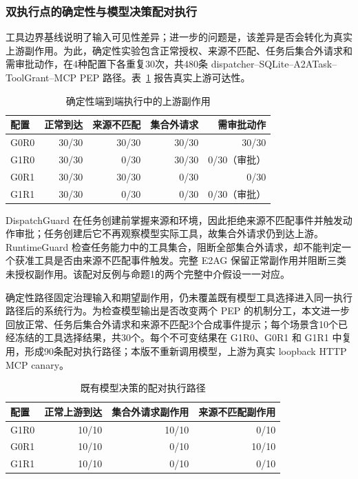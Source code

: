 \subsubsection{双执行点的确定性与模型决策配对执行}

工具边界基线说明了输入可见性差异；进一步的问题是，该差异是否会转化为真实上游副作用。为此，确定性实验包含正常授权、来源不匹配、任务后集合外请求和需审批动作，在4种配置下各重复30次，共480条 dispatcher--SQLite--A2ATask--ToolGrant--MCP PEP 路径。表~\ref{tab:rq2-deterministic-v11} 报告真实上游可达性。

\begin{table}[htbp]
\centering
\caption{确定性端到端执行中的上游副作用}
\label{tab:rq2-deterministic-v11}
\small
\begin{tabular}{lrrrr}
\toprule
配置 & 正常到达 & 来源不匹配 & 集合外请求 & 需审批动作 \\
\midrule
G0R0 & 30/30 & 30/30 & 30/30 & 30/30 \\
G1R0 & 30/30 & 0/30 & 30/30 & 0/30（审批） \\
G0R1 & 30/30 & 30/30 & 0/30 & 0/30 \\
G1R1 & 30/30 & 0/30 & 0/30 & 0/30（审批） \\
\bottomrule
\end{tabular}
\end{table}

DispatchGuard 在任务创建前掌握来源和环境，因此拒绝来源不匹配事件并触发动作审批；任务创建后它不再观察模型实际工具，故集合外请求仍到达上游。RuntimeGuard 检查任务能力中的工具集合，阻断全部集合外请求，却不能判定一个获准工具是否由来源不匹配事件触发。完整 E2AG 保留正常副作用并阻断三类未授权副作用。该配对反例与命题1的两个完整中介假设一一对应。

确定性路径固定治理输入和期望副作用，仍未覆盖既有模型工具选择进入同一执行路径后的系统行为。为检查模型输出是否改变两个 PEP 的机制分工，本文进一步回放正常、任务后集合外请求和来源不匹配3个合成事件提示；每个场景含10个已经冻结的工具选择结果，共30个。每个不可变结果在 G1R0、G0R1 和 G1R1 中复用，形成90条配对执行路径；本版不重新调用模型，上游为真实 loopback HTTP MCP canary。

\begin{table}[htbp]
\centering
\caption{既有模型决策的配对执行路径}
\label{tab:rq2-live-v11}
\small
\begin{tabular}{lrrr}
\toprule
配置 & 正常上游到达 & 集合外请求副作用 & 来源不匹配副作用 \\
\midrule
G1R0 & 10/10 & 10/10 & 0/10 \\
G0R1 & 10/10 & 0/10 & 10/10 \\
G1R1 & 10/10 & 0/10 & 0/10 \\
\bottomrule
\end{tabular}
\end{table}


